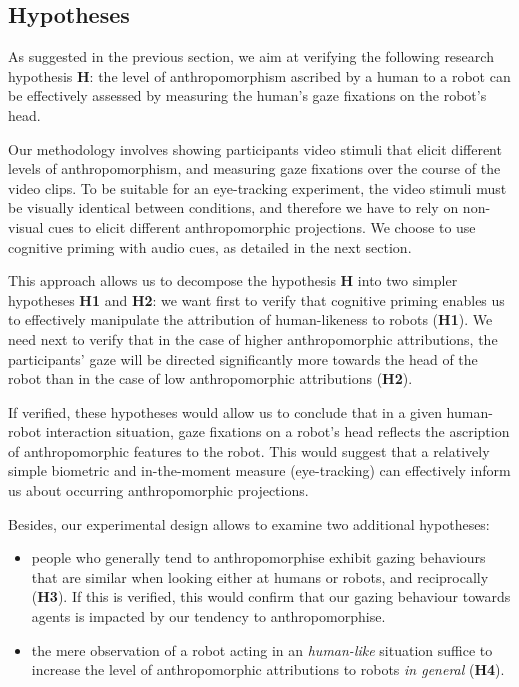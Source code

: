 \documentclass[lettersize, noapacite, twoside, HRI]{apa_HRI}
\newcommand{\h}[1]{\textbf{H#1}\xspace}
\begin{document}
\subsection{Hypotheses}

As suggested in the previous section, we aim at verifying the following research
hypothesis \h{}: the level of anthropomorphism ascribed by a human to a robot can be
effectively assessed by measuring the human's gaze fixations on the robot's head.

Our methodology involves showing participants video stimuli that elicit
different levels of anthropomorphism, and measuring gaze fixations over the
course of the video clips. To be suitable for an eye-tracking experiment, the
video stimuli must be visually identical between conditions, and therefore
we have to rely on non-visual cues to elicit different anthropomorphic
projections. We choose to use cognitive priming with audio cues, as detailed in
the next section.

This approach allows us to decompose the hypothesis \h{} into two simpler
hypotheses \h{1} and \h{2}: we want first to verify that cognitive priming
enables us to effectively manipulate the attribution of human-likeness to robots
(\h{1}).  We need next to verify that in the case of higher anthropomorphic
attributions, the participants' gaze will be directed significantly more towards
the head of the robot than in the case of low anthropomorphic attributions
(\h{2}).

If verified, these hypotheses would allow us to conclude that in a given
human-robot interaction situation, gaze fixations on a robot's head reflects the
ascription of anthropomorphic features to the robot. This would suggest that a
relatively simple biometric and in-the-moment measure (eye-tracking) can
effectively inform us about occurring anthropomorphic projections.


\vspace{1em}

Besides, our experimental design allows to examine two additional hypotheses:

\begin{itemize}
    \item people who generally tend to anthropomorphise exhibit gazing
        behaviours that are similar when looking either at humans or robots, and
        reciprocally (\h{3}). If this is verified, this would confirm that our
        gazing behaviour towards agents is impacted by our tendency to
        anthropomorphise.

    \item the mere observation of a robot acting in an \emph{human-like}
        situation suffice to increase the level of
        anthropomorphic attributions to robots \emph{in general} (\h{4}).
\end{itemize}
\end{document}
